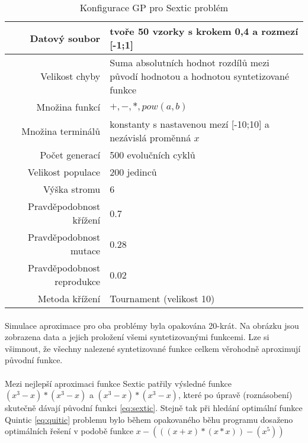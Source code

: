 \documentclass[bc,male,java,dept460]{diploma}		%
\begin{document}
\begin{table}
  \centering
  \begin{tabular}{| r | p{9cm} |} \hline
    Datový soubor & tvoře 50 vzorky s krokem 0,4 a rozmezí [-1;1] \\ \hline
    Velikost chyby & Suma absolutních hodnot rozdílů mezi původí hodnotou a hodnotou syntetizované funkce \\ \hline
    Množina funkcí & $+, -, *, pow(a,b)$ \\ \hline
    Množina terminálů & konstanty s nastavenou mezí [-10;10] a nezávislá proměnná $x$ \\ \hline
    Počet generací & 500 evolučních cyklů \\ \hline
    Velikost populace & 200 jedinců \\ \hline
    Výška stromu & 6 \\ \hline
    Pravděpodobnost křížení & 0.7 \\ \hline
    Pravděpodobnost mutace & 0.28 \\ \hline
    Pravděpodobnost reprodukce & 0.02 \\ \hline
    Metoda křížení & Tournament (velikost 10) \\ \hline
  \end{tabular}
  \label{tab:QuinticSexticConf}
  \caption{Konfigurace GP pro Sextic problém}
\end{table}





\paragraph*{}
Simulace aproximace pro oba problémy byla opakována 20-krát. Na obrázku jsou zobrazena data a jejich proložení všemi syntetizovanými funkcemi. Lze si všimnout, že všechny nalezené syntetizované funkce celkem věrohodně aproximují původní funkce.

\paragraph*{}
Mezi nejlepší aproximaci funkce Sextic patřily výsledné funkce $(x^3-x)*(x^3-x)$ a $(x^3-x)*(x^3-x)$, které po úpravě (roznásobení) skutečně dávají původní funkci \ref{eq:sextic}.
Stejně tak při hledání optimální funkce Quintic \ref{eq:quitic} problemu bylo během opakovaného běhu programu dosaženo optimálních řešení v podobě funkce $x-(((x+x)*(x*x))-(x^5))$
\end{document}

